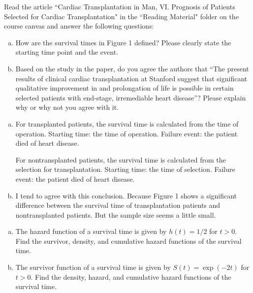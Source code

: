 \documentclass[12pt]{elegantbook}
\begin{document}
    \begin{exercise}
        Read the article “Cardiac Transplantation in Man, VI. Prognosis of Patients Selected for Cardiac Transplantation" in the “Reading Material" folder on the course canvas and answer the following questions: 
        \begin{enumerate}[(a)]
            \item How are the survival times in Figure 1 defined? Please clearly state the starting time point and the event.
            \item Based on the study in the paper, do you agree the authors that “The present results of clinical cardiac transplantation at Stanford suggest that significant qualitative improvement in and prolongation of life is possible in certain selected patients with end-stage, irremediable heart disease”? Please explain why or why not you agree with it. 
        \end{enumerate}
    \end{exercise}

    \begin{solution}
        \begin{enumerate}[(a)]
            \item For transplanted patients, the survival time is calculated from the time of operation. Starting time: the time of operation. Failure event: the patient died of heart disease. 
            
            For nontransplanted patients, the survival time is calculated from the selection for transplantation. Starting time: the time of selection. Failure event: the patient died of heart disease. 
            \item I tend to agree with this conclusion. Because Figure 1 shows a significant difference between the survival time of transplantation patients and nontransplanted patients. But the sample size seems a little small. 
        \end{enumerate}
    \end{solution}

    \begin{exercise}
        \begin{enumerate}[(a)]
            \item The hazard function of a survival time is given by $h(t) = 1/2$ for $t > 0$. Find the survivor, density, and cumulative hazard functions of the survival time. 
            \item The survivor function of a survival time is given by $S(t) = \exp(-2t)$ for $t > 0$. Find the density, hazard, and cumulative hazard functions of the survival time. 
        \end{enumerate}
    \end{exercise}
\end{document}
